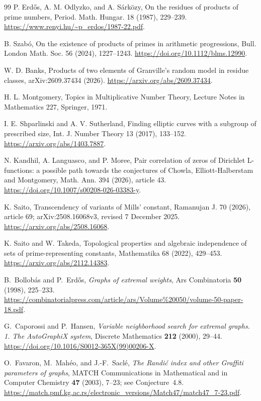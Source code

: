 \documentclass[11pt,a4paper]{article}
\theoremstyle{definition}
\theoremstyle{remark}
\begin{document}
\begin{thebibliography}{99}
P. Erd\H{o}s, A. M. Odlyzko, and A. S\'ark\"ozy,
On the residues of products of prime numbers,
Period. Math. Hungar. 18 (1987), 229--239.
\url{https://www.renyi.hu/~p_erdos/1987-22.pdf}.

B. Szab\'o, On the existence of products of primes in arithmetic progressions,
Bull. London Math. Soc. 56 (2024), 1227--1243.
\url{https://doi.org/10.1112/blms.12990}.

W. D. Banks, Products of two elements of Granville's random model in residue classes,
arXiv:2609.37434 (2026).
\url{https://arxiv.org/abs/2609.37434}.

H. L. Montgomery, Topics in Multiplicative Number Theory,
Lecture Notes in Mathematics 227, Springer, 1971.

I. E. Shparlinski and A. V. Sutherland,
Finding elliptic curves with a subgroup of prescribed size,
Int. J. Number Theory 13 (2017), 133--152.
\url{https://arxiv.org/abs/1403.7887}.

N. Kandhil, A. Languasco, and P. Moree,
Pair correlation of zeros of Dirichlet L-functions: a possible path towards
the conjectures of Chowla, Elliott-Halberstam and Montgomery,
Math. Ann. 394 (2026), article 43.
\url{https://doi.org/10.1007/s00208-026-03383-y}.

K. Saito, Transcendency of variants of Mills' constant,
Ramanujan J. 70 (2026), article 69; arXiv:2508.16068v3, revised 7 December 2025.
\url{https://arxiv.org/abs/2508.16068}.

K. Saito and W. Takeda,
Topological properties and algebraic independence of sets of prime-representing constants,
Mathematika 68 (2022), 429--453.
\url{https://arxiv.org/abs/2112.14383}.

B.~Bollob\'as and P.~Erd\H os,
\emph{Graphs of extremal weights},
Ars Combinatoria \textbf{50} (1998), 225--233.
\url{https://combinatorialpress.com/article/ars/Volume%20050/volume-50-paper-18.pdf}.

G.~Caporossi and P.~Hansen,
\emph{Variable neighborhood search for extremal graphs. 1. The AutoGraphiX system},
Discrete Mathematics \textbf{212} (2000), 29--44.
\url{https://doi.org/10.1016/S0012-365X(99)00206-X}.

O.~Favaron, M.~Mah\'eo, and J.-F.~Sacl\'e,
\emph{The Randi\'c index and other Graffiti parameters of graphs},
MATCH Communications in Mathematical and in Computer Chemistry
\textbf{47} (2003), 7--23; see Conjecture~4.8.
\url{https://match.pmf.kg.ac.rs/electronic_versions/Match47/match47_7-23.pdf}.


\end{thebibliography}
\end{document}
